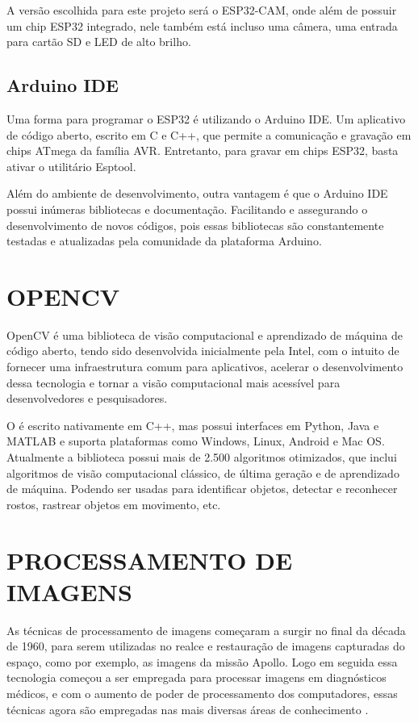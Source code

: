 A versão escolhida para este projeto será o ESP32-CAM, onde além de possuir um 
chip ESP32 integrado, nele também está incluso uma câmera, uma entrada para 
cartão SD e LED de alto brilho.

\subsection{Arduino IDE}\label{sec:espacamento}

Uma forma para programar o ESP32 é utilizando o Arduino IDE. Um aplicativo de 
código aberto, escrito em C e C++, que permite a comunicação e gravação em chips 
ATmega da família AVR. Entretanto, para gravar em chips ESP32, basta ativar 
o utilitário Esptool.

Além do ambiente de desenvolvimento, outra vantagem é que o Arduino IDE 
possui inúmeras bibliotecas e documentação. Facilitando e assegurando o 
desenvolvimento de novos códigos, pois essas bibliotecas são constantemente 
testadas e atualizadas pela comunidade da plataforma Arduino.

\section{OPENCV}\label{sec:formatacaoTexto}

OpenCV é uma biblioteca de visão computacional e aprendizado de 
máquina de código aberto, tendo sido desenvolvida inicialmente pela Intel, com o 
intuito de fornecer uma infraestrutura comum para aplicativos, acelerar o 
desenvolvimento dessa tecnologia e tornar a visão computacional mais acessível 
para desenvolvedores e pesquisadores.

O  é escrito nativamente em C++, mas possui interfaces em 
Python, Java e MATLAB e suporta plataformas como Windows, Linux, Android e 
Mac OS. Atualmente a biblioteca possui mais de 2.500 algoritmos otimizados, 
que inclui algoritmos de visão computacional clássico, de última geração 
e de aprendizado de máquina. Podendo ser usadas para identificar objetos,
detectar e reconhecer rostos, rastrear objetos em movimento, etc.

\section{PROCESSAMENTO DE IMAGENS}\label{sec:formatacaoTexto}

As técnicas de processamento de imagens começaram a surgir no final da década de 1960, 
para serem utilizadas no realce e restauração de imagens capturadas do espaço, 
como por exemplo, as imagens da missão Apollo. Logo em seguida essa tecnologia 
começou a ser empregada para processar imagens em diagnósticos médicos, e com 
o aumento de poder de processamento dos computadores, essas técnicas agora 
são empregadas nas mais diversas áreas de conhecimento \cite{gonzalez2010}.

